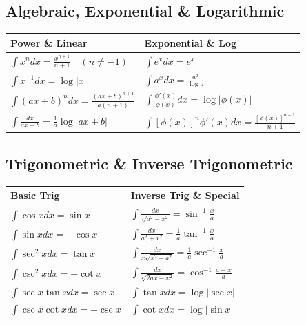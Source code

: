 \documentclass[11pt, a4paper]{article}
\begin{document}
\subsection*{\color{secondary} Algebraic, Exponential \& Logarithmic}
\begin{center}
\begin{tabular}{@{}p{} p{}@{}}
\toprule
\textbf{Power \& Linear} & \textbf{Exponential \& Log} \\
\midrule
$\int x^n dx = \frac{x^{n+1}}{n+1} \quad (n \neq -1)$ & $\int e^x dx = e^x$ \\
$\int x^{-1} dx = \log|x|$ & $\int a^x dx = \frac{a^x}{\log a}$ \\
$\int (ax+b)^n dx = \frac{(ax+b)^{n+1}}{a(n+1)}$ & $\int \frac{\phi'(x)}{\phi(x)} dx = \log|\phi(x)|$ \\
$\int \frac{dx}{ax+b} = \frac{1}{a} \log|ax+b|$ & $\int [\phi(x)]^n \phi'(x) dx = \frac{[\phi(x)]^{n+1}}{n+1}$ \\
\bottomrule
\end{tabular}
\end{center}

\vspace{0.3cm}

\subsection*{\color{secondary} Trigonometric \& Inverse Trigonometric}
\begin{center}
\begin{tabular}{@{}p{} p{}@{}}
\toprule
\textbf{Basic Trig} & \textbf{Inverse Trig \& Special} \\
\midrule
$\int \cos x dx = \sin x$ & $\int \frac{dx}{\sqrt{a^2-x^2}} = \sin^{-1}\frac{x}{a}$ \\
$\int \sin x dx = -\cos x$ & $\int \frac{dx}{a^2+x^2} = \frac{1}{a}\tan^{-1}\frac{x}{a}$ \\
$\int \sec^2 x dx = \tan x$ & $\int \frac{dx}{x\sqrt{x^2-a^2}} = \frac{1}{a}\sec^{-1}\frac{x}{a}$ \\
$\int \csc^2 x dx = -\cot x$ & $\int \frac{dx}{\sqrt{2ax-x^2}} = \cos^{-1}\frac{a-x}{a}$ \\
$\int \sec x \tan x dx = \sec x$ & $\int \tan x dx = \log|\sec x|$ \\
$\int \csc x \cot x dx = -\csc x$ & $\int \cot x dx = \log|\sin x|$ \\
\bottomrule
\end{tabular}
\end{center}
\end{document}
